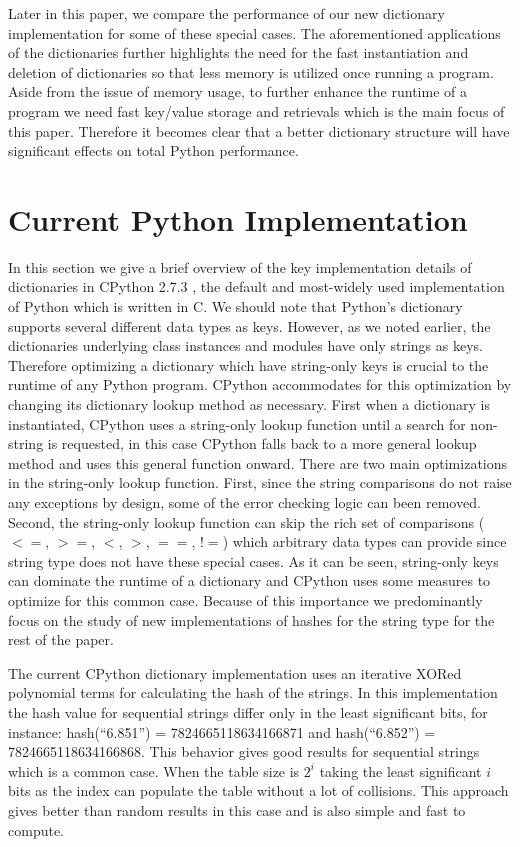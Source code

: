 \documentclass[runningheads,a4paper]{llncs}
\begin{document}
Later in this paper, we compare the performance of our new dictionary
implementation for some of these special cases. The aforementioned applications
of the dictionaries further highlights the need for the fast instantiation and
deletion of dictionaries so that less memory is utilized once running a program.
Aside from the issue of memory usage, to further enhance the runtime of a
program we need fast key/value storage and retrievals which is the main focus of
this paper. Therefore it becomes clear that a better dictionary structure will
have significant effects on total Python performance.

\section{Current Python Implementation}

In this section we give a brief overview of the key implementation details of
dictionaries in CPython 2.7.3 \cite{python27}, the default and most-widely used implementation
of Python which is written in C.  We should note that Python's dictionary supports
several different data types as keys. However, as we noted earlier, the
dictionaries underlying class instances and modules have only strings as keys.
Therefore optimizing a dictionary which have string-only keys is crucial to the
runtime of any Python program. CPython accommodates for this optimization by
changing its dictionary lookup method as necessary. First when a dictionary is
instantiated, CPython uses a string-only lookup function until a search for
non-string is requested, in this case CPython falls back to a more general
lookup method and uses this general function onward. There are two main
optimizations in the string-only lookup function.  First, since the string
comparisons do not raise any exceptions by design, some of the error checking
logic can been removed. Second, the string-only lookup function can skip the
rich set of comparisons ( $<=$, $>=$, $<$, $>$, $==$, $!=$) which arbitrary data
types can provide since string type does not have these special cases.  As it
can be seen, string-only keys can dominate the runtime of a dictionary and
CPython uses some measures to optimize for this common case. Because of this
importance we predominantly focus on the study of new implementations of
hashes for the string type for the rest of the paper.

The current CPython dictionary implementation uses an iterative XORed polynomial
terms for calculating the hash of the strings. In this implementation the hash
value for sequential strings differ only in the least significant bits, for
instance: hash(``6.851'') = 7824665118634166871 and hash(``6.852'') =
7824665118634166868. This behavior gives good results for sequential strings
which is a common case. When the table size is $2^i$ taking the least
significant $i$ bits as the index can populate the table without a lot of
collisions. This approach gives better than random results in this case and is
also simple and fast to compute.
\end{document}
